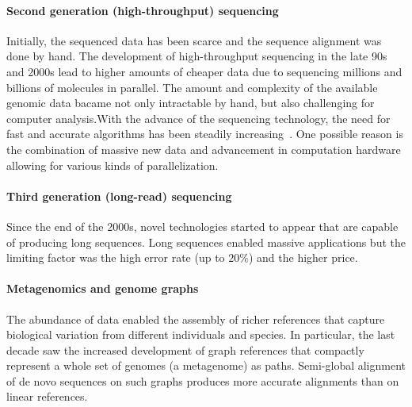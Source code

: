 \paragraph{Second generation (high-throughput) sequencing}
Initially, the sequenced data has been scarce and the sequence alignment was
done by hand. The development of high-throughput sequencing in the late 90s and
2000s lead to higher amounts of cheaper data due to sequencing millions and
billions of molecules in parallel. The amount and complexity of the available
genomic data bacame not only intractable by hand, but also challenging for
computer analysis.With the advance of the sequencing technology, the need for
fast and accurate algorithms has been steadily
increasing~\cite{alser2021technology}. One possible reason is the combination of
massive new data and advancement in computation hardware allowing for various
kinds of parallelization.

\paragraph{Third generation (long-read) sequencing}
Since the end of the 2000s, novel technologies started to appear that are
capable of producing long sequences. Long sequences enabled massive applications
but the limiting factor was the high error rate (up to $20\%$) and the higher
price.

\paragraph{Metagenomics and genome graphs}
The abundance of data enabled the assembly of richer references that capture
biological variation from different individuals and species. In particular, the
last decade saw the increased development of graph references that compactly
represent a whole set of genomes (a metagenome) as paths. Semi-global alignment
of de novo sequences on such graphs produces more accurate alignments than on
linear references.
